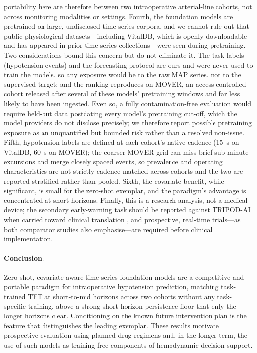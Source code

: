 \documentclass[11pt]{article}
\begin{document}
portability here are therefore between two intraoperative arterial-line cohorts,
not across monitoring modalities or settings. Fourth, the foundation models
are pretrained on large, undisclosed time-series corpora, and we cannot rule
out that public physiological datasets---including VitalDB, which is openly
downloadable and has appeared in prior time-series collections---were seen
during pretraining. Two considerations bound this concern but do not
eliminate it. The task labels (hypotension events) and the forecasting
protocol are ours and were never used to train the models, so any exposure
would be to the raw MAP series, not to the supervised target; and the ranking
reproduces on MOVER, an access-controlled cohort released after several of
these models' pretraining windows and far less likely to have been ingested.
Even so, a fully contamination-free evaluation would require held-out data
postdating every model's pretraining cut-off, which the model providers do
not disclose precisely; we therefore report possible pretraining exposure as
an unquantified but bounded risk rather than a resolved non-issue. Fifth,
hypotension labels are defined at each cohort's native cadence (15~s on
VitalDB, 60~s on MOVER); the coarser MOVER grid can miss brief sub-minute
excursions and merge closely spaced events, so prevalence and operating
characteristics are not strictly cadence-matched across cohorts and the two
are reported stratified rather than pooled. Sixth, the covariate
benefit, while significant, is small for the zero-shot exemplar, and the
paradigm's advantage is concentrated at short horizons. Finally, this is a
research analysis, not a medical device; the secondary early-warning task
should be reported against TRIPOD-AI when carried toward clinical
translation \citep{Collins2024}, and prospective, real-time trials---as both
comparator studies also emphasise---are required before clinical implementation.

\paragraph{Conclusion.} Zero-shot, covariate-aware time-series foundation
models are a competitive and portable paradigm for intraoperative
hypotension prediction, matching task-trained TFT at short-to-mid horizons across two cohorts
without any task-specific training, above a strong short-horizon persistence
floor that only the longer horizons clear.
Conditioning on the known future intervention plan is the feature that
distinguishes the leading exemplar. These results motivate prospective
evaluation using planned drug regimens and, in the longer term, the use of
such models as training-free components of hemodynamic decision support.
\end{document}

